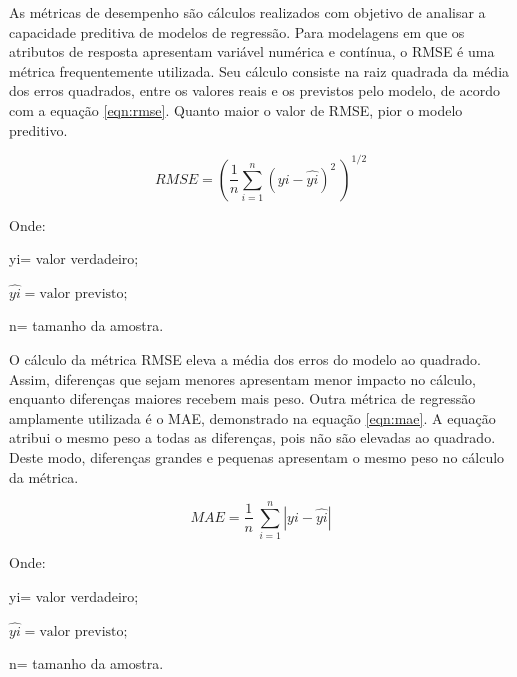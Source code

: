 As métricas de desempenho são cálculos realizados com objetivo de analisar a capacidade preditiva de modelos de regressão. Para modelagens em que os atributos de resposta apresentam variável numérica e contínua, o RMSE é uma métrica frequentemente utilizada. Seu cálculo consiste na raiz quadrada da média dos erros quadrados, entre os valores reais e os previstos pelo modelo, de acordo com a equação \ref{eqn:rmse}.  Quanto maior o valor de RMSE, pior o modelo preditivo.  

  
\begin{equation} 
RMSE = \left ( \frac{1}{n} \sum_{i=1}^{n} ({yi}-\hat{yi})^2 \ \right )^{1/2}  
    \label{eqn:rmse} 
\end{equation} 

Onde:

yi= valor verdadeiro;

$\hat{yi} = \textrm{valor previsto};$

n= tamanho da amostra.

\vspace{1cm}

O cálculo da métrica RMSE eleva a média dos erros do modelo ao quadrado. Assim, diferenças que sejam menores apresentam menor impacto no cálculo, enquanto diferenças maiores recebem mais peso. Outra métrica de regressão amplamente utilizada é o MAE, demonstrado na equação \ref{eqn:mae}. A equação atribui o mesmo peso a todas as diferenças, pois não são elevadas ao quadrado. Deste modo, diferenças grandes e pequenas apresentam o mesmo peso no cálculo da métrica.  


\begin{equation} 
    MAE = \frac{1}{n} \ \sum_{i=1}^{n} | yi - \hat{yi}|  
    \label{eqn:mae} 
\end{equation} 

Onde:

yi= valor verdadeiro;

$\hat{yi} = \textrm{valor previsto};$

n= tamanho da amostra.
\vspace{1cm}


